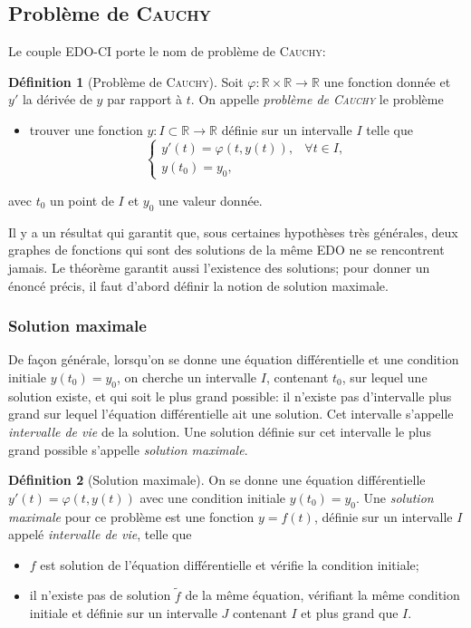 \documentclass[a4paper,10pt]{scrartcl}
\theoremstyle{definition}
\newtheorem{defi}{Définition}[section]
\theoremstyle{remark}
\theoremstyle{plain}
\newcommand{\ensemble}[1]{\mathbb{#1}}
\newcommand{\R}{\ensemble{R}}
\begin{document}
\subsection{Problème de \textsc{Cauchy}}
Le couple EDO-CI porte le nom de \flqq problème de \textsc{Cauchy}\frqq:
\begin{defi}[Problème de \textsc{Cauchy}]
Soit $\varphi \colon \R \times \R \to \R$ une fonction donnée et $y'$ la dérivée de $y$ par rapport à $t$. On appelle \emph{problème de \textsc{Cauchy}} le problème
\begin{itemize}
\item[]trouver une fonction $y \colon I\subset \R \to \R$ définie sur un intervalle $I$ telle que
\begin{equation}\label{pbCauchy}
\begin{cases}
y'(t) = \varphi(t,y(t)), &\forall t \in I,\\
y(t_0) = y_0,
\end{cases}
\end{equation}
\end{itemize}
avec $t_0$ un point de $I$ et $y_0$ une valeur donnée.
\end{defi}

Il y a un résultat qui garantit que, sous certaines hypothèses très générales, deux graphes de fonctions qui sont des solutions de la même EDO ne se rencontrent jamais. Le théorème garantit aussi l'existence des solutions; pour donner un énoncé précis, il faut d'abord définir la notion de solution maximale.


\subsubsection{Solution maximale}
De façon générale, lorsqu'on se donne une équation différentielle et une condition initiale $y(t_0) = y_0$, on cherche un intervalle $I$, contenant $t_0$, sur lequel une solution existe, et qui soit \flqq le plus grand possible\frqq: il n'existe pas d'intervalle plus grand sur lequel l'équation différentielle ait une solution. Cet intervalle s'appelle \emph{intervalle de vie} de la solution. Une solution définie sur cet intervalle le plus grand possible s'appelle \emph{solution maximale}.
\begin{defi}[Solution maximale]
On se donne une équation différentielle $y'(t)=\varphi(t,y(t))$ avec une condition initiale $y(t_0)=y_0$. Une \emph{solution maximale} pour ce problème est une fonction $y=f(t)$, définie sur un intervalle $I$ appelé \emph{intervalle de vie}, telle que
\begin{itemize}
\item $f$ est solution de l'équation différentielle et vérifie la condition initiale;
\item il n'existe pas de solution $\tilde f$ de la même équation, vérifiant la même condition initiale et définie sur un intervalle $J$ contenant $I$ et plus grand que $I$.
\end{itemize}
\end{defi}
\end{document}
